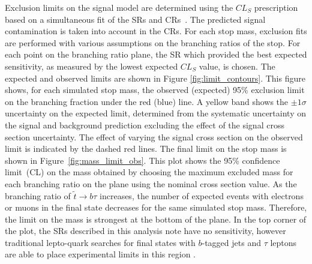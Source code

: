 Exclusion limits on the signal model are determined using the $CL_S$
prescription based on a simultaneous fit of the SRs and
CRs~\cite{Baak:2014wma}. The predicted signal contamination is
taken into account in the CRs.  For each stop mass,
exclusion fits are performed with various assumptions on the branching
ratios of the stop. For each point on the branching ratio plane, the
SR which provided the best expected sensitivity, as
measured by the lowest expected $CL_S$ value, is chosen. The expected
and observed limits are shown in Figure \ref{fig:limit_contours}. This figure
shows, for each simulated stop mass, the observed (expected) 95\% exclusion
limit on the 
branching fraction under the red (blue) line. A yellow band shows the
$\pm 1\sigma$ uncertainty on the expected limit, determined from the
systematic uncertainty on the signal and background prediction excluding
the effect of the signal cross section uncertainty.  The effect of varying
the signal cross section on the observed limit is indicated by the dashed
red lines.  The final limit on the stop mass is shown in
Figure~\ref{fig:mass_limit_obs}.  This plot shows the 95\% confidence
limit~(CL)
on the mass obtained by choosing the maximum excluded mass for each
branching ratio on the plane using the nominal cross section value.  
As the branching ratio of $\tilde{t} \rightarrow b\tau$ increases, the number
of expected events with electrons or muons in the final state decreases
for the same simulated stop mass. Therefore, the limit on the mass is
strongest at the bottom of the plane. In the top corner of the plot, the
SRs described in this analysis note have no sensitivity, however traditional
lepto-quark searches for final states with $b$-tagged jets and $\tau$ leptons
are able to place experimental limits in this region \cite{ATLAS:2013oea}.

